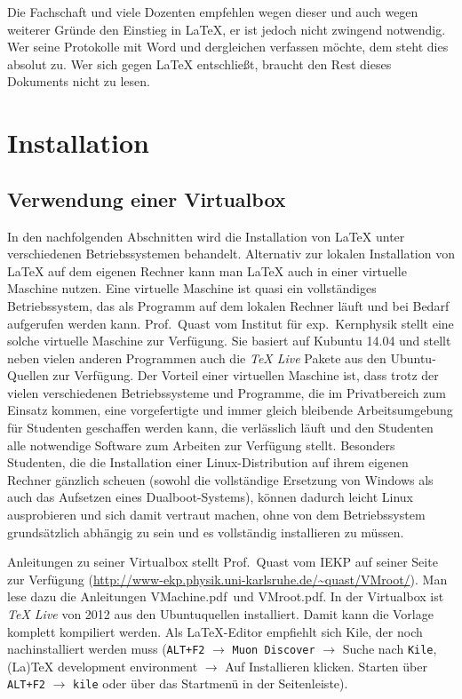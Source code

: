 Die Fachschaft und viele Dozenten empfehlen wegen dieser und auch wegen weiterer Gründe den Einstieg in LaTeX, er ist jedoch nicht zwingend notwendig. Wer seine Protokolle mit Word und dergleichen verfassen möchte, dem steht dies absolut zu. Wer sich gegen LaTeX entschließt, braucht den Rest dieses Dokuments nicht zu lesen.

\section{Installation}
\subsection{Verwendung einer Virtualbox}
In den nachfolgenden Abschnitten wird die Installation von LaTeX unter verschiedenen Betriebssystemen behandelt. Alternativ zur lokalen Installation von LaTeX auf dem eigenen Rechner kann man LaTeX auch in einer virtuelle Maschine nutzen. Eine virtuelle Maschine ist quasi ein vollständiges Betriebssystem, das als Programm auf dem lokalen Rechner läuft und bei Bedarf aufgerufen werden kann. Prof.~Quast vom Institut für exp.~Kernphysik stellt eine solche virtuelle Maschine zur Verfügung. Sie basiert auf Kubuntu 14.04 und stellt neben vielen anderen Programmen auch die \textit{TeX Live} Pakete aus den Ubuntu-Quellen zur Verfügung. Der Vorteil einer virtuellen Maschine ist, dass trotz der vielen verschiedenen Betriebssysteme und Programme, die im Privatbereich zum Einsatz kommen, eine vorgefertigte und immer gleich bleibende Arbeitsumgebung für Studenten geschaffen werden kann, die verlässlich läuft und den Studenten alle notwendige Software zum Arbeiten zur Verfügung stellt. Besonders Studenten, die die Installation einer Linux-Distribution auf ihrem eigenen Rechner gänzlich scheuen (sowohl die vollständige Ersetzung von Windows als auch das Aufsetzen eines Dualboot-Systems), können dadurch leicht Linux ausprobieren und sich damit vertraut machen, ohne von dem Betriebssystem grundsätzlich abhängig zu sein und es vollständig installieren zu müssen.

Anleitungen zu seiner Virtualbox stellt Prof.~Quast vom IEKP auf seiner Seite zur Verfügung (\url{http://www-ekp.physik.uni-karlsruhe.de/~quast/VMroot/}). Man lese dazu die Anleitungen \glqq VMachine.pdf\grqq\ und \glqq VMroot.pdf\grqq. In der Virtualbox ist \textit{TeX Live} von 2012 aus den Ubuntuquellen installiert. Damit kann die Vorlage komplett kompiliert werden. Als LaTeX-Editor empfiehlt sich Kile, der noch nachinstalliert werden muss (\verb|ALT+F2| $\rightarrow$ \verb|Muon Discover| $\rightarrow$ Suche nach \verb|Kile|, (La)TeX development environment $\rightarrow$ Auf Installieren klicken. Starten über \verb|ALT+F2| $\rightarrow$ \verb|kile| oder über das Startmenü in der Seitenleiste).

